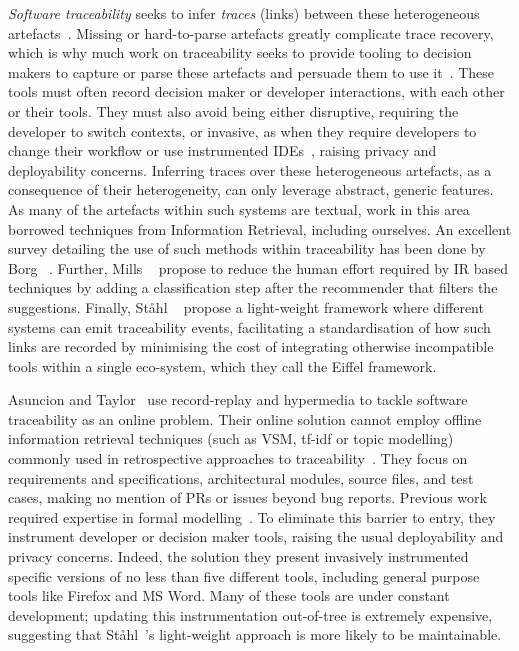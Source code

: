 \emph{Software traceability} seeks to infer \emph{traces} (\ie links) between
these heterogeneous artefacts~\cite{Cleland-Huang2014}. Missing or hard-to-parse
artefacts greatly complicate trace recovery, which is why much work on
traceability seeks to provide tooling to decision makers to capture or parse
these artefacts and persuade them to use it~\cite{Neumuller06, jiralinkdoc,
ghlinkdoc}. These tools must often record decision maker or developer
interactions, with each other or their tools. They must also avoid being either
disruptive, requiring the developer to switch contexts, or invasive, as when
they require developers to change their workflow or use instrumented
IDEs~\cite{TopicTraceability}, raising privacy and deployability concerns.
Inferring traces over these heterogeneous artefacts, as a consequence of their
heterogeneity, can only leverage abstract, generic features. As many of the
artefacts within such systems are textual, work in this area borrowed techniques
from Information Retrieval, including ourselves. An excellent survey detailing
the use of such methods within traceability has been done by Borg
\etal~\cite{Borg2014}. Further, Mills
\etal~\cite{Mills:2017:ATL:3106237.3121280} propose to reduce the human effort
required by IR based techniques by adding a classification step after the
recommender that filters the suggestions. Finally, St{\aa}hl
\etal~\cite{Stahl2017} propose a light-weight framework where different systems
can emit traceability events, facilitating a standardisation of how such links
are recorded by minimising the cost of integrating otherwise incompatible tools
within a single eco-system, which they call the Eiffel framework.

Asuncion and Taylor~\cite{Asuncion:2009:CCL:1556908.1557008} use record-replay
and hypermedia to tackle software traceability as an online problem. Their
online solution cannot employ offline information retrieval techniques (such as
VSM, tf-idf or topic modelling) commonly used in retrospective approaches to
traceability~\cite{4249808}. They focus on requirements and specifications,
architectural modules, source files, and test cases, making no mention of PRs or
issues beyond bug reports. Previous work required expertise in formal
modelling~\cite{Pohl96, Pinheiro96}. To eliminate this barrier to entry, they
instrument developer or decision maker tools, raising the usual deployability
and privacy concerns. Indeed, the solution they present invasively instrumented
specific versions of no less than five different tools, including general
purpose tools like Firefox and MS Word. Many of these tools are under constant
development; updating this instrumentation out-of-tree is extremely expensive,
suggesting that St{\aa}hl~\etal's light-weight approach is more likely to be
maintainable.

